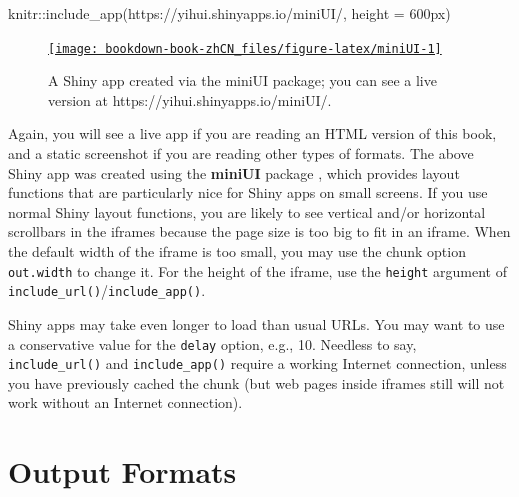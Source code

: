 \documentclass[
  12pt,
]{krantz}
\newenvironment{Shaded}{\begin{snugshade}}{\end{snugshade}}
\newcommand{\AttributeTok}[1]{\textcolor[rgb]{0.77,0.63,0.00}{#1}}
\newcommand{\FunctionTok}[1]{\textcolor[rgb]{0.00,0.00,0.00}{#1}}
\newcommand{\NormalTok}[1]{#1}
\newcommand{\SpecialCharTok}[1]{\textcolor[rgb]{0.00,0.00,0.00}{#1}}
\newcommand{\StringTok}[1]{\textcolor[rgb]{0.31,0.60,0.02}{#1}}
\let\oldhref\href
\renewcommand{\href}[2]{#2\footnote{\url{#1}}}
\theoremstyle{definition}
\theoremstyle{definition}
\theoremstyle{definition}
\theoremstyle{definition}
\theoremstyle{remark}
\begin{document}
\let\ooldhref\href
\let\href\oldhref

\begin{Shaded}
\begin{Highlighting}[]
\NormalTok{knitr}\SpecialCharTok{::}\FunctionTok{include\_app}\NormalTok{(}\StringTok{\textquotesingle{}https://yihui.shinyapps.io/miniUI/\textquotesingle{}}\NormalTok{, }\AttributeTok{height =} \StringTok{\textquotesingle{}600px\textquotesingle{}}\NormalTok{)}
\end{Highlighting}
\end{Shaded}

\begin{figure}

{\centering \oldhref{https://yihui.shinyapps.io/miniUI/}{\texttt{[image: bookdown-book-zhCN\_files/figure-latex/miniUI-1]} }

}

\caption{A Shiny app created via the miniUI package; you can see a live version at https://yihui.shinyapps.io/miniUI/.}\label{fig:miniUI}
\end{figure}

\let\href\ooldhref

Again, you will see a live app if you are reading an HTML version of this book, and a static screenshot if you are reading other types of formats. The above Shiny app was created using the \textbf{miniUI} package \citep{R-miniUI}, which provides layout functions that are particularly nice for Shiny apps on small screens. If you use normal Shiny layout functions, you are likely to see vertical and/or horizontal scrollbars in the iframes because the page size is too big to fit in an iframe. When the default width of the iframe is too small, you may use the chunk option \texttt{out.width} to change it. For the height of the iframe, use the \texttt{height} argument of \texttt{include\_url()}/\texttt{include\_app()}.

Shiny apps may take even longer to load than usual URLs. You may want to use a conservative value for the \texttt{delay} option, e.g., 10. Needless to say, \texttt{include\_url()} and \texttt{include\_app()} require a working Internet connection, unless you have previously cached the chunk (but web pages inside iframes still will not work without an Internet connection).

\hypertarget{output-formats}{%
\chapter{Output Formats}\label{output-formats}}
\end{document}
